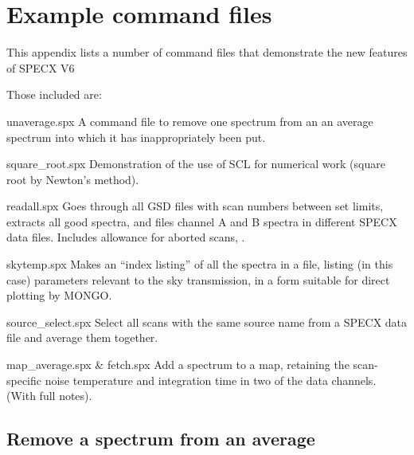 \documentclass[11pt,twoside]{report}
\begin{document}
\newpage
\chapter{Example command files} 

This appendix lists a number of command files that demonstrate the new
features of SPECX V6

Those included are:
\begin{description}
\item{unaverage.spx} A command file to remove one spectrum from an an
       average spectrum into which it has inappropriately been put.
\item{square\_root.spx} Demonstration of the use of SCL for numerical
       work (square root by Newton's method).
\item{readall.spx} Goes through all GSD files with scan numbers between
       set limits, extracts all good spectra, and files channel A and B
       spectra in different SPECX data files. Includes allowance for
       aborted scans, \etc.
\item{skytemp.spx} Makes an ``index listing'' of all the spectra in a
       file, listing (in this case) parameters relevant to the sky 
       transmission, in a form suitable for direct plotting by MONGO.
\item{source\_select.spx} Select all scans with the same source name from a
       SPECX data file and average them together.
\item{map\_average.spx \& fetch.spx} Add a spectrum to a map, retaining the
       scan-specific noise temperature and integration time in two of the
       data channels. (With full notes).
\end{description}

\newpage
\section{Remove a spectrum from an average} 
\end{document}
